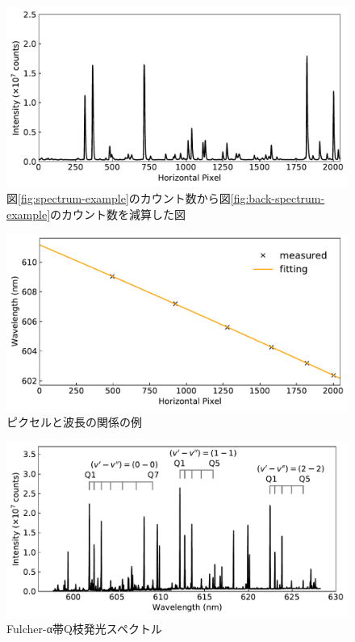 \begin{figure}
    \centering
    \includegraphics[width=15cm]{pictures/true-spectrum-example.pdf}
    \caption{図\ref{fig:spectrum-example}のカウント数から図\ref{fig:back-spectrum-example}のカウント数を減算した図}
    \label{fig:true-spectrum-example}
\end{figure}

\begin{figure}
    \centering
    \includegraphics[width=15cm]{pictures/pixel-to-wavelength.pdf}
    \caption{ピクセルと波長の関係の例}
    \label{fig:pixel-to-wavelength}
\end{figure}

\begin{figure}
    \centering
    \includegraphics[width=15cm]{pictures/all-spectrum.pdf}
    \caption{Fulcher-α帯Q枝発光スペクトル}
    \label{fig:all-spectrum}
\end{figure}

